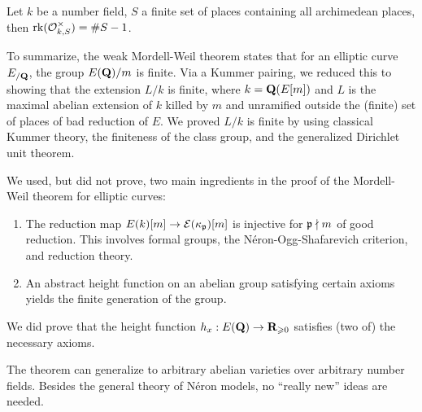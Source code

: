 \begin{theorem}
Let $k$ be a number field, $S$ a finite set of places containing all 
archimedean places, then $\operatorname{rk}(\mathcal{O}_{k,S}^\times)=\# S-1$. 
\end{theorem}

To summarize, the weak Mordell-Weil theorem states that for an elliptic curve 
$E_{/\mathbf{Q}}$, the group $E(\mathbf{Q})/m$ is finite. Via a Kummer pairing, we reduced 
this to showing that the extension $L/k$ is finite, where $k=\mathbf{Q}(E[m])$ and 
$L$ is the maximal abelian extension of $k$ killed by $m$ and unramified 
outside the (finite) set of places of bad reduction of $E$. We proved 
$L/k$ is finite by using classical Kummer theory, the finiteness of the class 
group, and the generalized Dirichlet unit theorem. 

We used, but did not prove, two main ingredients in the proof of the 
Mordell-Weil theorem for elliptic curves:
\begin{enumerate}
\item The reduction map $E(k)[m]\to \mathcal{E}(\kappa_{\mathfrak{p}})[m]$ is injective for 
$\mathfrak{p}\nmid m$ of good reduction. This involves formal groups, the 
N\'eron-Ogg-Shafarevich criterion, and reduction theory. 

\item An abstract height function on an abelian group satisfying certain 
axioms yields the finite generation of the group. 
\end{enumerate}

We did prove that the height function $h_x:E(\mathbf{Q})\to \mathbf{R}_{\geqslant 0}$ 
satisfies (two of) the necessary axioms. 

The theorem can generalize to arbitrary abelian varieties over arbitrary 
number fields. Besides the general theory of N\'eron models, no ``really new'' 
ideas are needed. 






